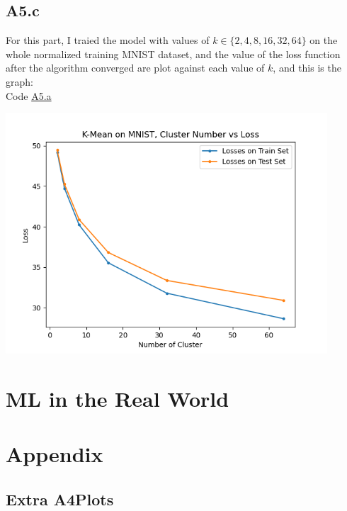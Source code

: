 \documentclass[]{article}
\begin{document}
    \subsection*{A5.c}
        For this part, I traied the model with values of $k\in \{2, 4, 8, 16, 32, 64\}$ on the whole normalized training MNIST dataset, and the value of the loss function after the algorithm converged are plot against each value of $k$, and this is the graph: 
        \\
        Code \hyperref[A5.a]{A5.a}
        \begin{center}
            \includegraphics*[width=12cm]{A5bplots/22-04-21-A5b-k-vs-loss.png}
        \end{center}
    
        
        
\section*{ML in the Real World}


\section*{Appendix}
    \subsection*{Extra A4Plots}
\end{document}

